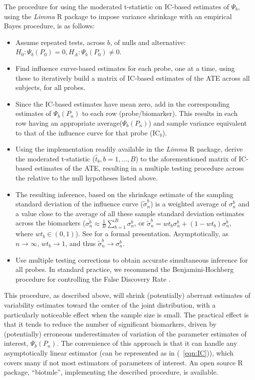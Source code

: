 The procedure for using the moderated t-statistic on IC-based estimates of
$\Psi_b$, using the {\em Limma} R package to impose variance shrinkage with an
empirical Bayes procedure, is as follows:
\begin{itemize}
\item Assume repeated tests, across $b$, of nulls and alternative: $H_0: \Psi_b(P_0) = 0, H_A: \Psi_b(P_0) \ne 0 $.
\item Find influence curve-based estimates for each probe, one at a time,
       using these to iteratively build a matrix of IC-based estimates of the
       ATE across all subjects, for all probes.
\item  Since the IC-based estimates have mean zero, add in the corresponding
       estimates of $\Psi_b(P_n)$ to each row (probe/biomarker). This results
       in each row having an appropriate average($\Psi_b(P_n)$) and sample variance
       equivalent to that of the influence curve for that probe ($\text{IC}_b$).
\item  Using the implementation readily available in the {\em Limma} R package,
       derive the moderated t-statistic ($ \tilde{t_b}, b = 1, \dots, B $) to
       the aforementioned matrix of IC-based estimates of the ATE, resulting in a multiple testing procedure across the
       relative to the null hypotheses listed above.
       \item  The resulting inference, based on the  shrinkage estimate of the
       sampling standard deviation of the influence curve ($\tilde{\sigma}^b_n$)
       is a weighted average of $\sigma^b_n$ and a value close to the average
       of all these sample standard deviation estimates across the biomarkers
       ($\overline{\sigma^b_n} \approx \frac{1}{B} \sum_{b = 1}^B \sigma^b_n$,
       or $\widetilde{\sigma}^b_n = wt_b \sigma^b_n+(1 -
       wt_b)\overline{\sigma^b_n}$, where $wt_b \in (0, 1)$). See
       \cite{smyth2005limma} for a formal presentation. Asymptotically, as $n
       \rightarrow \infty$, $wt_b \rightarrow 1$, and thus
       $\widetilde{\sigma}^b_n \rightarrow  \sigma^b_n$.
  \item Use multiple testing corrections to obtain accurate simultaneous
        inference for all probes. In standard practice, we recommend the
        Benjamini-Hochberg procedure for controlling the False Discovery Rate
        \cite{benjamini1995controlling}.
\end{itemize}

This procedure, as described above, will shrink (potentially) aberrant
estimates of variability estimates toward the center of the joint distribution,
with a particularly noticeable effect when the sample size is small. The
practical effect is that it tends to reduce the number of significant
biomarkers, driven by (potentially) erroneous underestimates of variation of
the parameter estimates of interest, $\Psi_b(P_n)$. The convenience of this
approach is that it can handle any asymptotically linear estimator (can be
represented as in (~\ref{eqn:IC})), which covers many if not most estimators of
parameters of interest. An open source R package, ``biotmle'', implementing the
described procedure, is available.
